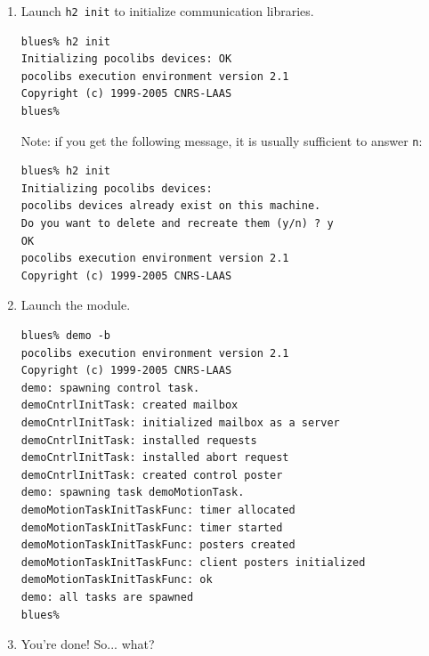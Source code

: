 \begin{enumerate}
\item Launch {\tt h2 init} to initialize communication libraries.

\begin{center}\begin{cartouche}\small\begin{verbatim}
blues% h2 init
Initializing pocolibs devices: OK
pocolibs execution environment version 2.1
Copyright (c) 1999-2005 CNRS-LAAS
blues%
\end{verbatim}\end{cartouche}\end{center}

Note: if you get the following message, it is usually sufficient to
answer {\tt n}:

\begin{center}\begin{cartouche}\small\begin{verbatim}
blues% h2 init
Initializing pocolibs devices: 
pocolibs devices already exist on this machine.
Do you want to delete and recreate them (y/n) ? y
OK
pocolibs execution environment version 2.1
Copyright (c) 1999-2005 CNRS-LAAS
\end{verbatim}\end{cartouche}\end{center}

\item Launch the module.

\begin{center}\begin{cartouche}\small\begin{verbatim}
blues% demo -b
pocolibs execution environment version 2.1
Copyright (c) 1999-2005 CNRS-LAAS
demo: spawning control task.
demoCntrlInitTask: created mailbox
demoCntrlInitTask: initialized mailbox as a server
demoCntrlInitTask: installed requests
demoCntrlInitTask: installed abort request
demoCntrlInitTask: created control poster
demo: spawning task demoMotionTask.
demoMotionTaskInitTaskFunc: timer allocated
demoMotionTaskInitTaskFunc: timer started
demoMotionTaskInitTaskFunc: posters created
demoMotionTaskInitTaskFunc: client posters initialized
demoMotionTaskInitTaskFunc: ok
demo: all tasks are spawned
blues% 
\end{verbatim}\end{cartouche}\end{center}

\item You're done! So... what?
\end{enumerate}

